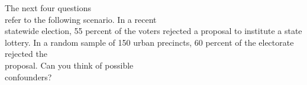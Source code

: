 \documentclass[11pt, chapterprefix=true]{scrbook}\usepackage[]{graphicx}\usepackage[]{color}
\begin{document}
\begin{exercises}
\begin{exercise}
The next four questions \\ refer to the following scenario.  In a recent \\ statewide election, 55 percent of the voters rejected a proposal to institute a state lottery.  In a random sample of 150 urban precincts, 60 percent of the electorate rejected the \\ proposal.  Can you think of possible  \\ confounders? 
  \end{exercise}
%
%
%
%
%
%
%
%
%
%

\end{exercises}
\end{document}
